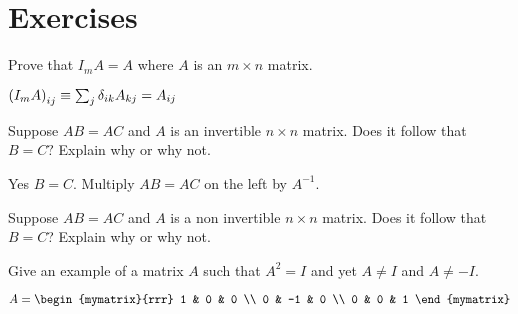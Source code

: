 \section*{Exercises}

\begin{enumialphparenastyle}

\begin{ex} Prove that $I_{m}A=A$ where $A$ is an $m\times n$ matrix.
\begin{sol}
 $\left(
I_{m}A\right) _{ij}\equiv \sum_{j}\delta _{ik}A_{kj}=A_{ij}$
\end{sol}
\end{ex}

\begin{ex} Suppose $AB=AC$ and $A$ is an invertible $n\times n$ matrix. Does it
follow that $B=C?$ Explain why or why not. 
\begin{sol}
Yes $B=C$. Multiply $AB = AC$ on the left by $A^{-1}$. 
\end{sol}
\end{ex}

\begin{ex} Suppose $AB=AC$ and $A$ is a non invertible $n\times n$ matrix. Does it follow that $B=C$? Explain why or why not.  
\end{ex}

\begin{ex} Give an example of a matrix $A$ such that $A^{2}=I$ and yet $A\neq I$
and $A\neq -I.$ 
\begin{sol}
$A = \begin{mymatrix}{rrr}
1 & 0 & 0 \\
0 & -1 & 0 \\
0 & 0 & 1
\end{mymatrix} $
\end{sol}
\end{ex}

\end{enumialphparenastyle}
